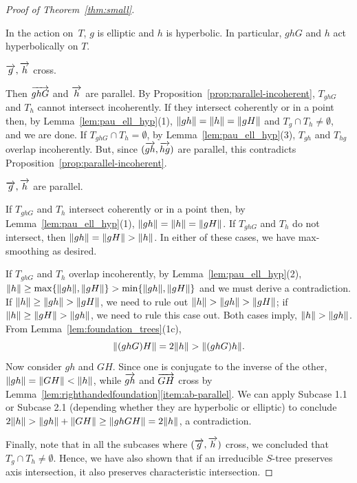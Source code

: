 \begin{proof}[Proof of Theorem~\ref{thm:small}]
\begin{case}
  In the action on~$T$, $g$ is elliptic and $h$ is hyperbolic.
  In particular, $ghG$ and $h$ act hyperbolically on $T$.
\end{case}
\begin{subcase}
$\overrightarrow{g},\overrightarrow{h}$ cross.
\end{subcase}
Then $\overrightarrow{ghG}$ and $\overrightarrow{h}$ are parallel.
By Proposition~\ref{prop:parallel-incoherent}, $T_{ghG}$ and $T_{h}$
cannot intersect incoherently. If they intersect coherently or in a
point then, by Lemma~\ref{lem:pau_ell_hyp}(1), $\lVert gh \rVert = \lVert h\rVert=
\lVert gH\rVert$ and
$T_g \cap T_h \ne \emptyset$, and we
are done. If $T_{ghG} \cap T_{h} = \emptyset$, by
Lemma~\ref{lem:pau_ell_hyp}(3), $T_{gh}$ and $T_{hg}$ overlap
incoherently. But, since $(\overrightarrow{gh},\overrightarrow{hg})$ are parallel, this
contradicts Proposition~\ref{prop:parallel-incoherent}.
\begin{subcase} $\overrightarrow{g},\overrightarrow{h}$ are parallel. \end{subcase}
If $T_{ghG}$ and $T_{h}$ intersect coherently or in a
point then, by Lemma~\ref{lem:pau_ell_hyp}(1), $\lVert gh \rVert = \lVert h\rVert = \lVert gH\rVert$.
If $T_{ghG}$ and $T_{h}$ do not intersect, then
$\lVert gh\rVert=\lVert gH\rVert > \lVert h\rVert$. In either of these cases, we have
max-smoothing as desired.

If $T_{ghG}$ and $T_{h}$ overlap incoherently, by 
Lemma~\ref{lem:pau_ell_hyp}(2), $\lVert h\rVert \geq \max \{ \lVert gh\rVert, \lVert gH\rVert \} > \min \{ \lVert gh\rVert, \lVert gH\rVert \}$ and we must
derive a contradiction.
If $\lVert h\rVert \geq \lVert gh\rVert>\lVert gH\rVert$, we need to rule out $\lVert h\rVert > \lVert gh\rVert > \lVert gH\rVert$; if $\lVert h\rVert \geq \lVert gH\rVert>\lVert gh\rVert$, we need to rule this case out.
Both cases imply, $\lVert h\rVert>\lVert gh\rVert$.
From
Lemma~\ref{lem:foundation_trees}(1c),
\[
\lVert(ghG)H\rVert=2\lVert h\rVert > \lVert(ghG)h\rVert.
\]
Now consider $gh$ and $GH$. Since one is conjugate to the inverse of
the other, $\lVert gh\rVert = \lVert GH\rVert < \lVert h\rVert$, while $\overrightarrow{gh}$ and $\overrightarrow{GH}$ cross by Lemma~\ref{lem:righthandedfoundation}\ref{item:ab-parallel}.
We can apply Subcase 1.1 or Subcase 2.1
(depending whether they are hyperbolic or elliptic) to conclude
$2\|h\|>\norm{gh} + \norm{GH} \ge \norm{ghGH}=2\|h\|$, a contradiction.

\medskip
Finally, note that in all the subcases where
$(\overrightarrow{g},\overrightarrow{h})$ cross,
we concluded that $T_g \cap T_h \neq \emptyset$.
Hence, we have also shown that if an irreducible $S$-tree preserves
axis intersection, it also preserves characteristic intersection.
\end{proof}

